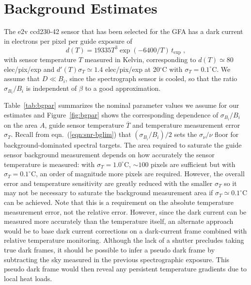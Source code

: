 \documentclass[11pt]{article}
\providecommand{\eqn}[1]{eqn.~(\ref{eqn:#1})}
\providecommand{\tab}[1]{Table~\ref{tab:#1}}
\providecommand{\fig}[1]{Figure~\ref{fig:#1}}
\begin{document}
\section{Background Estimates}

The e2v ccd230-42 sensor that has been selected for the GFA has a dark current in electrons per pixel per guide exposure of
\begin{equation}
d(T) = 19335 T^3 \exp(-6400/T)\,t_{\text{exp}} \; ,
\end{equation}
with sensor temperature $T$ measured in Kelvin, corresponding to $d(T) \simeq 80$ elec/pix/exp and $d'(T)\sigma_T \simeq 1.4$ elec/pix/exp at 20$^\circ$C with $\sigma_T = 0.1^\circ$C. We assume that $D \ll B_i$, since the spectrograph sensor is cooled, so that the ratio $\sigma_{B_i}/B_i$ is independent of $\beta$ to a good approximation.

\tab{bgpar} summarizes the nominal parameter values we assume for our estimates and \fig{bgpar} shows the corresponding dependence of $\sigma_{B_i}/B_i$ on the area $A$, guide sensor temperature $\overline{T}$ and temperature measurement error $\sigma_T$. Recall from \eqn{snr-bglim} that $(\sigma_{B_i}/B_i)/2$ sets the $\sigma_{\nu}/\nu$ floor for background-dominated spectral targets. The area required to saturate the guide sensor background measurement depends on how accurately the sensor temperature is measured: with $\sigma_T = 1.0^\circ$C, $\sim 100$ pixels are sufficient but with $\sigma_T = 0.1^\circ$C, an order of magnitude more pixels are required. However, the overall error and temperature sensitivity are greatly reduced with the smaller $\sigma_T$ so it may not be necessary to saturate the background measurement area if $\sigma_T \simeq 0.1^\circ$C can be achieved. Note that this is a requirement on the absolute temperature measurement error, not the relative error. However, since the dark current can be measured more accurately than the temperature itself, an alternate approach would be to base dark current corrections on a dark-current frame combined with relative temperature monitoring.  Although the lack of a shutter precludes taking true dark frames, it should be possible to infer a pseudo dark frame by subtracting the sky measured in the previous spectrographic exposure. This pseudo dark frame would then reveal any persistent temperature gradients due to local heat loads.
\end{document}
